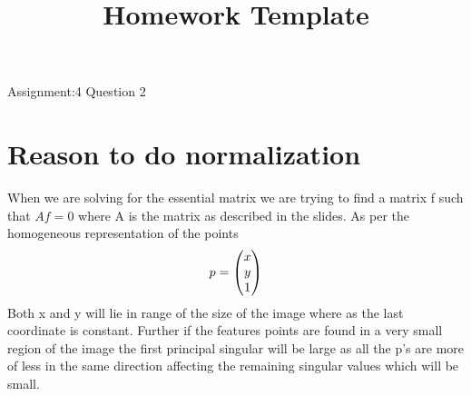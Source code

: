 \documentclass[11pt]{article}
\begin{document}
\newcommand*\colvec[3][]{
    \begin{pmatrix}\ifx\relax#1\relax\else#1\\\fi#2\\#3\end{pmatrix}
}
\def\bs{\textbackslash}
\setlength\parindent{0pt}
\def\reals{\hbox{\rm I\kern-.18em R}}
\def\complexes{\hbox{\rm C\kern-.43em
\vrule depth 0ex height 1.4ex width .05em\kern.41em}}
\def\field{\hbox{\rm I\kern-.18em F}} %
\title{Homework Template}
\setcounter{page}{1}
\begin{center}
Assignment:4 Question 2
\end{center}
\vspace{1ex}

\section{Reason to do normalization}
When we are solving for the essential matrix we are trying to find a matrix f such that $Af=0$ where A is the matrix as described in the slides.
As per the homogeneous representation of the points
\begin{eqnarray}
p = \colvec[x]{y}{1}
\end{eqnarray}
Both x and y will lie in range of the size of the image where as the last coordinate is constant. Further if the features points are found in a very small region of the image the first principal singular will be large  as all the p's are more of less in the same direction affecting the remaining singular values which will be small.
\end{document}
